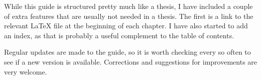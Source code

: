 While this guide is structured pretty much like a thesis, I have
included a couple of extra features that are usually not needed in a
thesis. The first is a link to the relevant \LaTeX{} file at the
beginning of each chapter. I have also started to add an index, as
that is probably a useful complement to the table of contents.

Regular updates are made to the guide, so it is worth checking every
so often to see if a new version is available. Corrections and
suggestions for improvements are very welcome.


